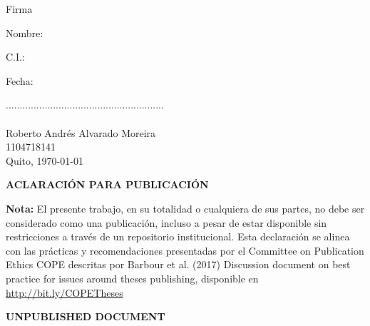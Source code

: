 \documentclass[a4paper, 12pt]{report}
\begin{document}
\vspace{2cm}
\noindent
\begin{minipage}{0.18\linewidth}   
  \large Firma\\
  \vspace{1cm}

  \large Nombre:
  \vspace{1cm}

  \large C.I.:
  \vspace{1cm}

  \large Fecha:
  \vspace{1cm}

\end{minipage}
\begin{minipage}{0.8\linewidth}
  \vspace{0.3cm}
  \large .........................................................\\
  \vspace{1cm}\\
  \large Roberto Andrés Alvarado Moreira
  \vspace{1cm}\\
  \large 1104718141
  \vspace{1cm}\\
  \large Quito, \today
  \vspace{1cm}

\end{minipage}


\newpage
\begin{center}
\begin{LARGE}
\textbf{ACLARACIÓN PARA PUBLICACIÓN}
\end{LARGE}
\end{center}

\setlength{\parskip}{5mm}

\textbf{Nota:} El presente trabajo, en su totalidad o cualquiera de sus partes, no debe ser considerado como una publicación, incluso a pesar de estar disponible sin restricciones a través de un repositorio institucional. Esta declaración se alinea con las prácticas y recomendaciones presentadas por el Committee on Publication Ethics COPE descritas por Barbour et al. (2017) Discussion document on best practice for issues around theses publishing, disponible en \url{http://bit.ly/COPETheses}

\setlength{\parskip}{10mm}
\begin{center}
\begin{LARGE}
\textbf{UNPUBLISHED DOCUMENT}
\end{LARGE}
\end{center}
\end{document}
